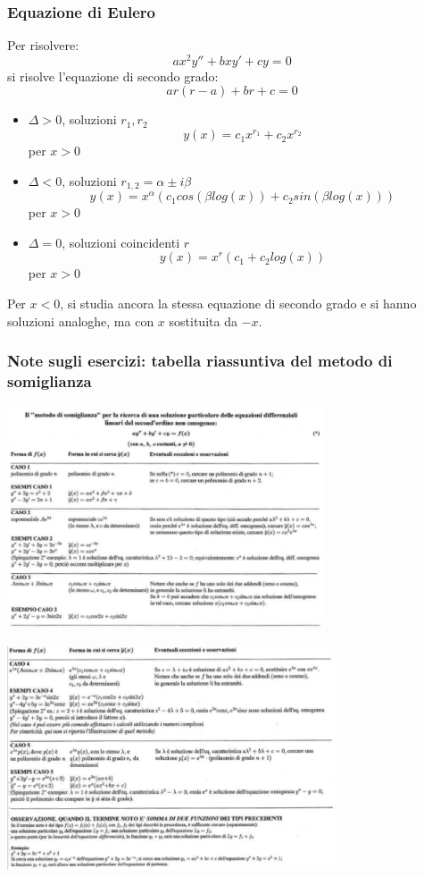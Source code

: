 \subsubsection{Equazione di Eulero}
Per risolvere:
\[
    ax^2y''+bxy'+cy= 0
\]
si risolve l'equazione di secondo grado:
\[
    ar(r-a)+br+c = 0
\]
\begin{itemize}
    \item $\Delta >0$, soluzioni $r_1, r_2$
    \[
        y(x) =c_1x^{r_1}+c_2x^{r_2}
    \]
    per $x>0$
    \item $\Delta <0$, soluzioni $r_{1,2} = \alpha \pm i \beta$
    \[
        y(x) = x^{\alpha}(c_1 cos(\beta log(x)) + c_2 sin(\beta log(x)))
    \]
    per $x>0$
    \item $\Delta = 0$, soluzioni coincidenti $r$
    \[
        y(x) = x^r(c_1 + c_2log(x))
    \]
    per $x>0$
\end{itemize}
Per $x<0$, si studia ancora la stessa equazione di secondo grado e si hanno soluzioni analoghe, ma con $x$ sostituita da $-x$.\newline
\subsubsection{Note sugli esercizi: tabella riassuntiva del metodo di somiglianza}
\begin{center}
    \includegraphics[height=250px]{../img/eqdiff2.PNG}
\end{center}
\begin{center}
    \includegraphics[height=250px]{../img/eqdiff2(1).PNG}
\end{center}